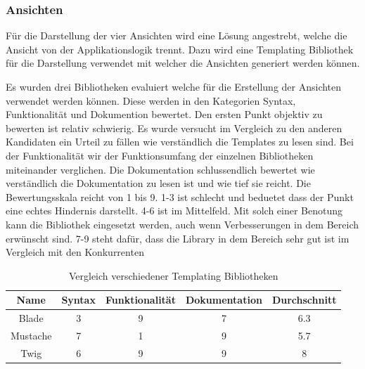 \subsubsection{Ansichten}
\label{sec:proofofconcept:architektur:anforderungen:ansichten}
Für die Darstellung der vier Ansichten wird eine Lösung angestrebt, welche die Ansicht von der Applikationslogik trennt. Dazu wird eine Templating Bibliothek für die Darstellung verwendet mit welcher die Ansichten generiert werden können. 

Es wurden drei Bibliotheken evaluiert welche für die Erstellung der Ansichten verwendet werden können. Diese werden in den Kategorien Syntax, Funktionalität und Dokumention bewertet. Den ersten Punkt objektiv zu bewerten ist relativ schwierig. Es wurde versucht im Vergleich zu den anderen Kandidaten ein Urteil zu fällen wie verständlich die Templates zu lesen sind. Bei der Funktionalität wir der Funktionsumfang der einzelnen Bibliotheken miteinander verglichen. Die Dokumentation schlussendlich bewertet wie verständlich die Dokumentation zu lesen ist und wie tief sie reicht. Die Bewertungsskala reicht von 1 bis 9. 1-3 ist schlecht und beduetet dass der Punkt eine echtes Hindernis darstellt. 4-6 ist im Mittelfeld. Mit solch einer Benotung kann die Bibliothek eingesetzt werden, auch wenn Verbesserungen in dem Bereich erwünscht sind. 7-9 steht dafür, dass die Library in dem Bereich sehr gut ist im Vergleich mit den Konkurrenten
\begin{table}[H] 
	\caption{Vergleich verschiedener Templating Bibliotheken}
	\centering
	\label{fig:proofofconcept:architektur:anforderungen:ansichten:1}
	\begin{tabular}{ | c | c | c | c | c | } 
		\hline 		
		\rowcolor{tableheadcolor}
		\bfseries Name & \bfseries Syntax & \bfseries Funktionalität & \bfseries Dokumentation & \bfseries Durchschnitt \\ \hline 
		
		Blade & \cellcolor{red!25}3 & \cellcolor{green!25}9 & \cellcolor{green!25}7 & \cellcolor{yellow!25}6.3\\ \hline 
		Mustache & \cellcolor{yellow!25}7 & \cellcolor{red!25}1 & \cellcolor{green!25}9 & \cellcolor{yellow!25}5.7\\ \hline 
		Twig & \cellcolor{green!25}6 & \cellcolor{green!25}9 & \cellcolor{green!25}9 & \cellcolor{green!25}8 \\ \hline 
	\end{tabular}
\end{table}

